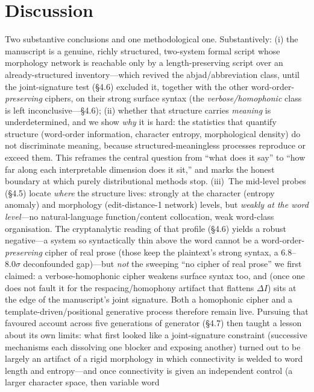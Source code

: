 \documentclass[11pt]{article}
\begin{document}
\section{Discussion}
Two substantive conclusions and one methodological one. Substantively: (i) the
manuscript is a genuine, richly structured, two-system formal script whose morphology
network is reachable only by a length-preserving script over an already-structured
inventory---which revived the abjad/abbreviation class, until the joint-signature test
(\S4.6) excluded it, together with the other word-order-\emph{preserving} ciphers, on their
strong surface syntax (the \emph{verbose/homophonic} class is left inconclusive---\S4.6); (ii) whether that structure carries
\emph{meaning} is underdetermined, and we show \emph{why} it is hard: the statistics
that quantify structure (word-order information, character entropy, morphological
density) do not discriminate meaning, because structured-meaningless processes reproduce
or exceed them. This reframes the central question from ``what does it say'' to ``how far
along each interpretable dimension does it sit,'' and marks the honest boundary at which
purely distributional methods stop. (iii)~The mid-level probes (\S4.5) locate
\emph{where} the structure lives: strongly at the character (entropy anomaly) and
morphology (edit-distance-1 network) levels, but \emph{weakly at the word level}---no
natural-language function/content collocation, weak word-class organisation. The
cryptanalytic reading of that profile (\S4.6) yields a robust negative---a system so
syntactically thin above the word cannot be a word-order-\emph{preserving} cipher of real
prose (those keep the plaintext's strong syntax, a $6.8$--$8.0\sigma$ deconfounded gap)---but
\emph{not} the sweeping ``no cipher of real prose'' we first claimed: a verbose-homophonic
cipher weakens surface syntax too, and (once one does not fault it for the
respacing/homophony artifact that flattens $\Delta I$) sits at the edge of the manuscript's
joint signature. Both a homophonic cipher and a template-driven/positional generative process
therefore remain live. Pursuing that
favoured account across five generations of generator (\S4.7) then taught a lesson about
its own limits: what first looked like a joint-signature constraint (successive mechanisms
each dissolving one blocker and exposing another) turned out to be largely an artifact of a
rigid morphology in which connectivity is welded to word length and entropy---and once
connectivity is given an independent control (a larger character space, then variable word
\end{document}
